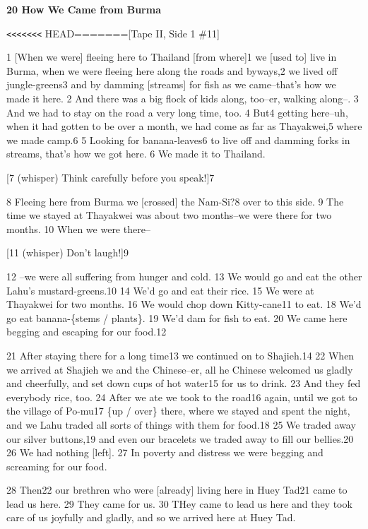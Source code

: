 
{\textbf{20 How We Came from Burma}}

{\texttt{<}\texttt{<}\texttt{<}\texttt{<}\texttt{<}\texttt{<}\texttt{<}
HEAD=======[Tape II, Side 1 \#11]}

{1 [When we were] fleeing here to Thailand [from where]1 we [used to] live
in Burma, when we were fleeing here along the roads and byways,2 we lived off jungle-greens3
and by damming [streams] for fish as we came--that's how we made it here. 2 And
there was a big flock of kids along, too--er, walking along--. 3 And we had to
stay on the road a very long time, too. 4 But4 getting here--uh, when it had gotten
to be over a month, we had come as far as Thayakwei,5 where we made camp.6 5 Looking
for banana-leaves6 to live off and damming forks in streams, that's how we got
here. 6 We made it to Thailand.}

{[7 (whisper) Think carefully before you speak!]7}

{8 Fleeing here from Burma we [crossed] the Nam-Si?8 over to this side.
9 The time we stayed at Thayakwei was about two months--we were there for two months.
10 When we were there--}

{[11 (whisper) Don't laugh!]9}

{12 --we were all suffering from hunger and cold. 13 We would go and eat
the other Lahu's mustard-greens.10 14 We'd go and eat their rice. 15 We were at
Thayakwei for two months. 16 We would chop down Kitty-cane11 to eat. 18 We'd go
eat banana-\{stems / plants\}. 19 We'd dam for fish to eat. 20 We came here begging
and escaping for our food.12}

{21 After staying there for a long time13 we continued on to Shajieh.14
22 When we arrived at Shajieh we and the Chinese--er, all he Chinese welcomed us
gladly and cheerfully, and set down cups of hot water15 for us to drink. 23 And
they fed everybody rice, too. 24 After we ate we took to the road16 again, until
we got to the village of Po-mu17 \{up / over\} there, where we stayed and spent
the night, and we Lahu traded all sorts of things with them for food.18 25 We traded
away our silver buttons,19 and even our bracelets we traded away to fill our bellies.20
26 We had nothing [left]. 27 In poverty and distress we were begging and screaming
for our food.}

{28 Then22 our brethren who were [already] living here in Huey Tad21 came
to lead us here. 29 They came for us. 30 THey came to lead us here and they took
care of us joyfully and gladly, and so we arrived here at Huey Tad. }

